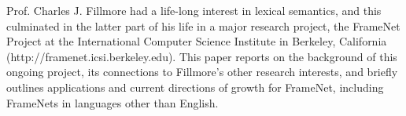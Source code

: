 Prof. Charles J. Fillmore had a life-long interest in lexical semantics, and this culminated in the latter part of his life in a major research project, the FrameNet Project at the International Computer Science Institute in Berkeley, California (http://framenet.icsi.berkeley.edu).  This paper reports on the background of this ongoing project, its connections to Fillmore's other research interests, and briefly outlines applications and current directions of growth for FrameNet, including FrameNets in languages other than English.
